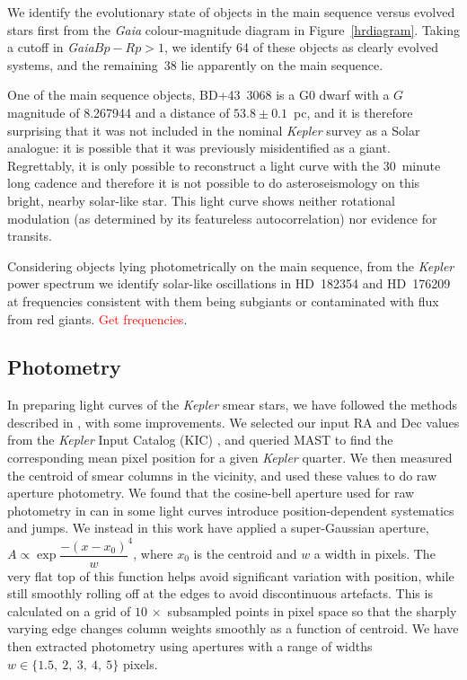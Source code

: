 \documentclass[a4paper,fleqn,usenatbib]{mnras}
\newcommand{\kepler}{\emph{Kepler}\xspace}
\newcommand{\gaia}{\emph{Gaia}\xspace}
\begin{document}
We identify the evolutionary state of objects in the main sequence versus evolved stars first from the \gaia colour-magnitude diagram in Figure~\ref{hrdiagram}. Taking a cutoff in \gaia $Bp-Rp > 1$, we identify 64 of these objects as clearly evolved systems, and the remaining~38 lie apparently on the main sequence. 

One of the main sequence objects, BD+43~3068 is a G0 dwarf with a $G$ magnitude of 8.267944 and a distance of $53.8 \pm 0.1$~pc, and it is therefore surprising that it was not included in the nominal \kepler survey as a Solar analogue: it is possible that it was previously misidentified as a giant. Regrettably, it is only possible to reconstruct a light curve with the 30~minute long cadence and therefore it is not possible to do asteroseismology on this bright, nearby solar-like star. This light curve shows neither rotational modulation (as determined by its featureless autocorrelation) nor evidence for transits.

Considering objects lying photometrically on the main sequence, from the \kepler power spectrum we identify solar-like oscillations in HD~182354 and HD~176209 at frequencies consistent with them being subgiants or contaminated with flux from red giants. \textcolor{red}{Get frequencies}.

\subsection{Photometry}
\label{photometry}

In preparing light curves of the \kepler smear stars, we have followed the methods described in \citet{smear}, with some improvements. We selected our input RA and Dec values from the \kepler Input Catalog (KIC) \citep{kic}, and queried MAST to find the corresponding mean pixel position for a given \kepler quarter. We then measured the centroid of smear columns in the vicinity, and used these values to do raw aperture photometry. We found that the cosine-bell aperture used for raw photometry in \citet{smear} can in some light curves introduce position-dependent systematics and jumps. We instead in this work have applied a super-Gaussian aperture, $A \propto \exp{\dfrac{-(x-x_0)}{w} ^ 4}$, where $x_0$ is the centroid and $w$ a width in pixels. The very flat top of this function helps avoid significant variation with position, while still smoothly rolling off at the edges to avoid discontinuous artefacts. This is calculated on a grid of $10\,\times$ subsampled points in pixel space so that the sharply varying edge changes column weights smoothly as a function of centroid. We have then extracted photometry using apertures with a range of widths $w \in\{1.5,~2,~3,~4,~5\}$ pixels.
\end{document}
